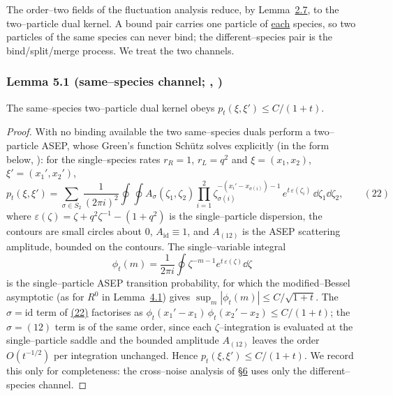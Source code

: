 \documentclass[11pt]{article}
\theoremstyle{plain}
\theoremstyle{definition}
\theoremstyle{remark}
\begin{document}
The order--two fields of the fluctuation analysis reduce, by Lemma~\hyperref[lem_acr]{2.7}, to
the two--particle dual kernel. A bound pair carries one particle of \underline{each}
species, so two particles of the same species can never bind; the different--species
pair is the bind/split/merge process. We treat the two channels.

\subsubsection{Lemma 5.1 (same--species channel; {\cite{Schutz}}, {\cite{TW08}})}\label{lem_asep}

The same--species two--particle dual kernel obeys $p_t(\xi,\xi')\le C/(1+t)$.
\par
\begin{proof}
With no binding available the two same--species duals perform a two--particle ASEP, whose
Green's function Sch\"utz solves explicitly \cite{Schutz} (in the form below, \cite{TW08}):
for the single--species rates $r_R=1$, $r_L=q^2$ and $\xi=(x_1,x_2)$, $\xi'=(x_1',x_2')$,
\label{eq_schutz2}
\begin{equation}
  p_t(\xi,\xi')=\sum_{\sigma\in S_2}\frac1{(2\pi i)^2}\oint\!\!\oint
  A_\sigma(\zeta_1,\zeta_2)\prod_{i=1}^2
  \zeta_{\sigma(i)}^{-(x_i'-x_{\sigma(i)})-1}\,e^{t\,\varepsilon(\zeta_i)}\,\dd\zeta_1\dd\zeta_2,\qquad(22)
\end{equation}
where $\varepsilon(\zeta)=\zeta+q^2\zeta^{-1}-(1+q^2)$ is the single--particle dispersion,
the contours are small circles about $0$, $A_{\mathrm{id}}\equiv1$, and $A_{(12)}$ is the
ASEP scattering amplitude, bounded on the contours. The single--variable integral
\[
  \phi_t(m)=\frac1{2\pi i}\oint \zeta^{-m-1}e^{t\,\varepsilon(\zeta)}\dd\zeta
\]
is the single--particle ASEP transition probability, for which the modified--Bessel
asymptotic (as for $R^0$ in Lemma~\hyperref[lem_free]{4.1}) gives $\sup_m|\phi_t(m)|\le C/\sqrt{1+t}$.
The $\sigma=\mathrm{id}$ term of \hyperref[eq_schutz2]{(22)} factorises as
$\phi_t(x_1'-x_1)\,\phi_t(x_2'-x_2)\le C/(1+t)$; the $\sigma=(12)$ term is of the same
order, since each $\zeta$--integration is evaluated at the single--particle saddle and the
bounded amplitude $A_{(12)}$ leaves the order $O(t^{-1/2})$ per integration unchanged.
Hence $p_t(\xi,\xi')\le C/(1+t)$. We record this only for completeness: the cross--noise
analysis of \S\hyperref[sec_ew]{6} uses only the different--species channel.
\end{proof}
\end{document}
